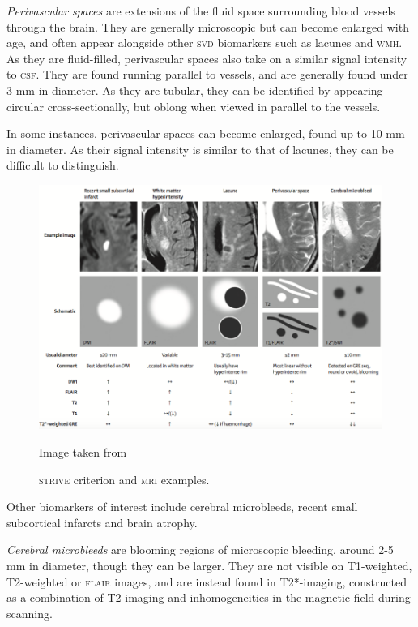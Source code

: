 \textit{Perivascular spaces} are extensions of the fluid space surrounding blood vessels through the brain. They are generally microscopic but can become enlarged with age, and often appear alongside other \textsc{svd} biomarkers such as lacunes and \textsc{wmh}. As they are fluid-filled, perivascular spaces also take on a similar signal intensity to \textsc{csf}. They are found running parallel to vessels, and are generally found under 3 mm in diameter. As they are tubular, they can be identified by appearing circular cross-sectionally, but oblong when viewed in parallel to the vessels.

In some instances, perivascular spaces can become enlarged, found up to 10 mm in diameter. As their signal intensity is similar to that of lacunes, they can be difficult to distinguish. 

\begin{figure}[ht]
	\centering
	\includegraphics[width = \textwidth]{Images/2_STRIVE.png}
	\caption{\textsc{strive} criterion and \textsc{mri} examples.}
	\small Image taken from \cite{WardlawJ.M.2013Nsfr}
\end{figure}

Other biomarkers of interest include cerebral microbleeds, recent small subcortical infarcts and brain atrophy. 

\textit{Cerebral microbleeds} are blooming regions of microscopic bleeding, around 2-5 mm in diameter, though they can be larger. They are not visible on T1-weighted, T2-weighted or \textsc{flair} images, and are instead found in T2*-imaging, constructed as a combination of T2-imaging and inhomogeneities in the magnetic field during scanning. 

